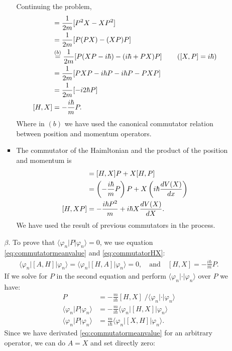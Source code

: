 \documentclass[letterpaper,11pt,twoside]{article}
\newcommand{\braket}[1]{\langle#1\rangle}
\begin{document}
\begin{enumerate}[itemsep=0pt,topsep=0pt,label=\alph*.]
\begin{enumerate}[itemsep=0pt,topsep=0pt]
\begin{itemize}[itemsep=0pt,topsep=0pt]
      Continuing the problem,
      \begin{align}
        [H,X]&=\frac{1}{2m}[P^2X-XP^2]\notag\\
        &=\frac{1}{2m}[P(PX)-(XP)P]\notag\\
        &\stackrel{(b)}{=}\frac{1}{2m}[P(XP-i\hbar)-(i\hbar+PX)P]\qquad\left([X,P]=i\hbar\right)\notag\\
        &=\frac{1}{2m}[PXP-i\hbar P-i\hbar P-PXP]\notag\\
        &=\frac{1}{2m}[-i2\hbar P]\notag\\
        [H,X]&=-\frac{i\hbar}{m}P.\label{eq:commutatorHX}
      \end{align}
      Where in $(b)$ we have used the canonical commutator relation between position and momentum operators.
      \item The commutator of the Haimltonian and the product of the position and momentum is
      \begin{align}
        [H,XP]&=[H,X]P+X[H,P]\notag\\
        &=\left(-\frac{i\hbar}{m}P\right)P+X\left(i\hbar\frac{dV(X)}{dx}\right)\notag\\
        [H,XP]&=-\frac{i\hbar P^2}{m}+i\hbar X\frac{dV(X)}{dX}.\label{eq:commutatorHXP}
      \end{align}  
      We have used the result of previous commutators in the process.
    \end{itemize}
    \item[$\beta$.]  To prove that $\braket{\varphi_n|P|\varphi_n}=0$, we use equation \eqref{eq:commutatormeanvalue} and \eqref{eq:commutatorHX}:
    \begin{align*}
      \braket{\varphi_n|[A,H]|\varphi_n}=\braket{\varphi_n|[H,A]|\varphi_n}=0,\quad\text{and}\quad[H,X]=-\frac{i\hbar}{m}P.
    \end{align*}
    If we solve for $P$ in the second equation and perform $\braket{\varphi_n|\cdot|\varphi_n}$ over $P$ we have:
    \begin{align*}
      P&=-\frac{m}{i\hbar}[H,X]\;\bigr/\braket{\varphi_n|\cdot|\varphi_n}\\
      \braket{\varphi_n|P|\varphi_n}&=-\frac{m}{i\hbar}\braket{\varphi_n|[H,X]|\varphi_n}\\
      \braket{\varphi_n|P|\varphi_n}&=\frac{m}{i\hbar}\braket{\varphi_n|[X,H]|\varphi_n}.
    \end{align*}
    Since we have derivated \eqref{eq:commutatormeanvalue} for an arbitrary operator, we can do $A=X$ and set directly zero:

\end{enumerate}
\end{enumerate}
\end{document}
